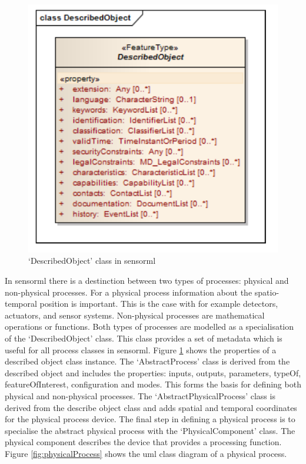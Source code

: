\begin{figure}
	\centering
	\includegraphics[width=0.5\linewidth]{UML/describedObject.png}
	\caption{`DescribedObject' class in \ac{sensorml} \citep[p. 39]{SW:OGC7}}
	\label{fig:describedObject}
\end{figure}

In \ac{sensorml} there is a destinction between two types of processes: physical and non-physical processes. For a physical process information about the spatio-temporal position is important. This is the case with for example detectors, actuators, and sensor systems. Non-physical processes are mathematical operations or functions. Both types of processes are modelled as a specialisation of the `DescribedObject' class. This class provides a set of metadata which is useful for all process classes in \ac{sensorml}. Figure \ref{fig:describedObject} shows the properties of a described object class instance. The `AbstractProcess' class is derived from the described object and includes the properties: inputs, outputs, parameters, typeOf, featureOfInterest, configuration and modes. This forms the basis for defining both physical and non-physical processes. The `AbstractPhysicalProcess'  class is derived from the describe object class and adds spatial and temporal coordinates for the physical process device. The final step in defining a physical process is to specialise the abstract physical process with the `PhysicalComponent' class. The physical component describes the device that provides a processing function. Figure \ref{fig:physicalProcess} shows the \ac{uml} class diagram of a physical process. 

